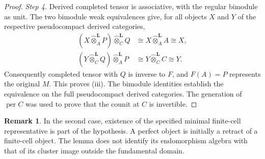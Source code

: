 \documentclass[12pt,a4paper,english,reqno]{amsart}
\theoremstyle{plain}
\theoremstyle{definition}
\newtheorem{rmk}[thm]{Remark}
\numberwithin{equation}{section}
\def\perf{\operatorname{per}}
\def\iso{\cong}
\def\ox{\otimes}
\begin{document}
\begin{proof}
\medskip\noindent\emph{Step 4.}
Derived completed tensor is associative, with the regular bimodule as unit. The two bimodule weak equivalences give, for all objects $X$ and $Y$ of the respective pseudocompact derived categories,
\begin{align*}
 (X\widehat\ox_A^{\mathbf L}P)
       \widehat\ox_C^{\mathbf L}Q
 &\iso X\widehat\ox_A^{\mathbf L}A\iso X,\\
 (Y\widehat\ox_C^{\mathbf L}Q)
       \widehat\ox_A^{\mathbf L}P
 &\iso Y\widehat\ox_C^{\mathbf L}C\iso Y.
\end{align*}
Consequently completed tensor with $Q$ is inverse to $F$, and $F(A)=P$ represents the original $M$. This proves (iii). The bimodule identities establish the equivalence on the full pseudocompact derived categories. The generation of $\perf C$ was used to prove that the counit at $C$ is invertible.
\end{proof}

\begin{rmk}
In the second case, existence of the specified minimal finite-cell representative is part of the hypothesis. A perfect object is initially a retract of a finite-cell object. The lemma does not identify its endomorphism algebra with that of its cluster image outside the fundamental domain.
\end{rmk}
\end{document}
